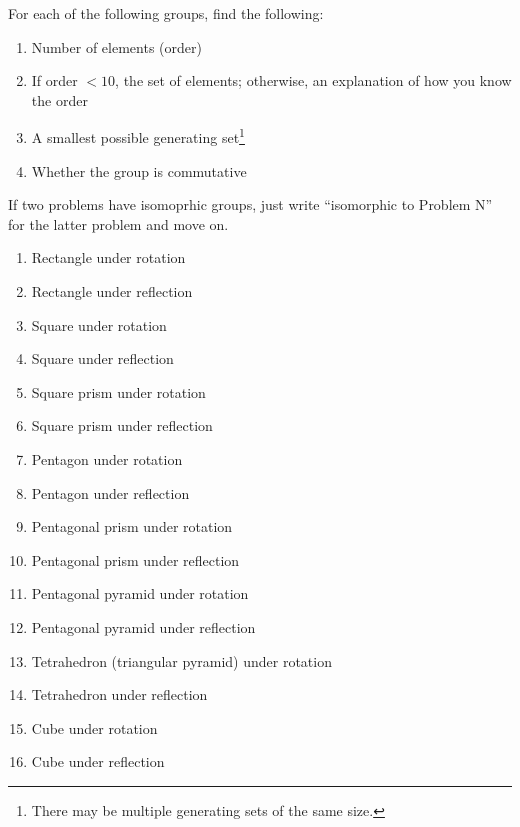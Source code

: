 \documentclass[../gatm.tex]{subfiles}
\begin{document}
For each of the following groups, find the following:

\begin{enumerate}[label=(\alph*)]
\item Number of elements (order)
\item If order $< 10$, the set of elements; otherwise, an explanation of how you know the order
\item A smallest possible generating set\footnote{There may be multiple generating sets of the same size.}
\item Whether the group is commutative
\end{enumerate}

If two problems have isomoprhic groups, just write ``isomorphic to Problem N'' for the latter problem and move on.

\begin{multicols}{2}
\begin{enumerate}
\setcounter{enumi}{\value{problem_i}}
\item Rectangle under rotation
\item Rectangle under reflection
\item Square under rotation
\item Square under reflection
\item Square prism under rotation
\item Square prism under reflection
\item Pentagon under rotation
\item Pentagon under reflection
\item Pentagonal prism under rotation
\item Pentagonal prism under reflection
\item Pentagonal pyramid under rotation
\item Pentagonal pyramid under reflection
\item Tetrahedron (triangular pyramid) under rotation
\item Tetrahedron under reflection
\item Cube under rotation
\item Cube under reflection
\end{enumerate}
\end{multicols}
\end{document}
